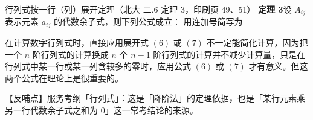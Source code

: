 \begin{fdeep}{行列式按一行（列）展开定理（北大 二.6 定理 3，印刷页 49、51）}
\textbf{定理 3}\quad 设
$A_{ij}$ 表示元素 $a_{ij}$ 的代数余子式，则下列公式成立：
用连加号简写为

在计算数字行列式时，直接应用展开式 $(6)$ 或 $(7)$ 不一定能简化计算，因为把一个 $n$ 阶行列式的计算换成 $n$ 个 $n-1$ 阶行列式的计算并不减少计算量，只是在行列式中某一行或某一列含较多的零时，应用公式 $(6)$ 或 $(7)$ 才有意义。但这两个公式在理论上是很重要的。

【反哺点】服务考纲「行列式」：这是「降阶法」的定理依据，也是「某行元素乘另一行代数余子式之和为 0」这一常考结论的来源。
\end{fdeep}

